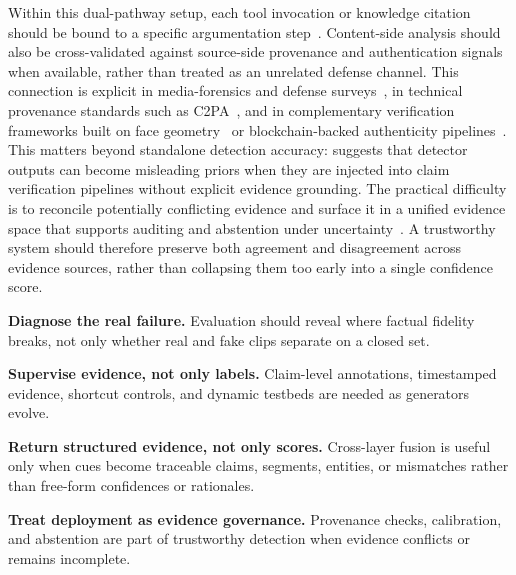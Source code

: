 Within this dual-pathway setup, each tool invocation or knowledge citation should be bound to a specific argumentation step~\citep{Liu2025LAVID}. Content-side analysis should also be cross-validated against source-side provenance and authentication signals when available, rather than treated as an unrelated defense channel. This connection is explicit in media-forensics and defense surveys~\citep{Verdoliva2020MediaForensicsDeepFakes,Deng2025AIGCDefensesSurvey}, in technical provenance standards such as C2PA~\citep{c2pa2024spec}, and in complementary verification frameworks built on face geometry~\citep{tursman2020towards} or blockchain-backed authenticity pipelines~\citep{hajjej2026framework}. This matters beyond standalone detection accuracy: \citet{sagar2026fact} suggests that detector outputs can become misleading priors when they are injected into claim verification pipelines without explicit evidence grounding. The practical difficulty is to reconcile potentially conflicting evidence and surface it in a unified evidence space that supports auditing and abstention under uncertainty~\citep{Wang2024DeepfakeReliability}. A trustworthy system should therefore preserve both agreement and disagreement across evidence sources, rather than collapsing them too early into a single confidence score.

\begin{surveytakeaways}
  \item \textbf{Diagnose the real failure.} Evaluation should reveal where factual fidelity breaks, not only whether real and fake clips separate on a closed set.
  \item \textbf{Supervise evidence, not only labels.} Claim-level annotations, timestamped evidence, shortcut controls, and dynamic testbeds are needed as generators evolve.
  \item \textbf{Return structured evidence, not only scores.} Cross-layer fusion is useful only when cues become traceable claims, segments, entities, or mismatches rather than free-form confidences or rationales.
  \item \textbf{Treat deployment as evidence governance.} Provenance checks, calibration, and abstention are part of trustworthy detection when evidence conflicts or remains incomplete.
\end{surveytakeaways}
